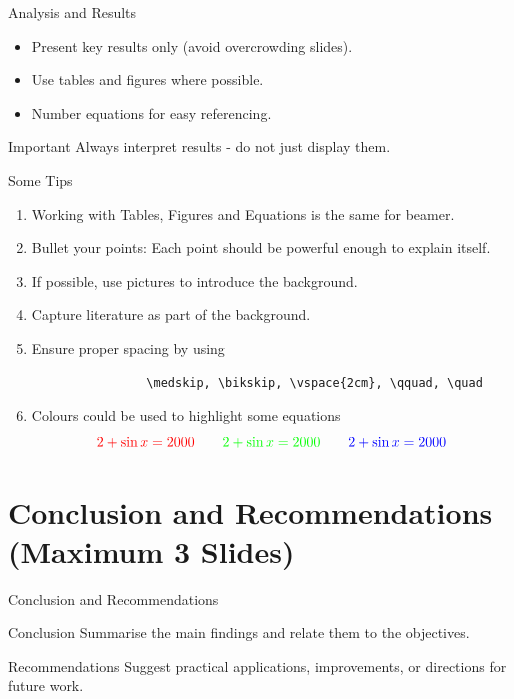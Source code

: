 \documentclass[aspectratio=169,12pt]{beamer}
\newcommand{\bcol}[2][blue]{\textcolor{#1}{#2}}
\begin{document}
	\begin{frame}{Analysis and Results}
		\begin{itemize}[<+->]
			\item Present key results only (avoid overcrowding slides).
			\item Use tables and figures where possible.
			\item Number equations for easy referencing.
		\end{itemize}
		
		\begin{alertblock}{Important}
			Always interpret results - do not just display them.
		\end{alertblock}
	\end{frame}
	
	
	\begin{frame}[fragile]{Some Tips} 
		\begin{enumerate} 
			\item Working with Tables, Figures and Equations is the same for beamer. 
			\item Bullet your points: Each point should be powerful enough to explain itself. 
			\item If possible, use pictures to introduce the background. 
			\item Capture literature as part of the background. 
			\item Ensure proper spacing by using 
			\begin{verbatim} 
				\medskip, \bikskip, \vspace{2cm}, \qquad, \quad 
			\end{verbatim} 
			\item Colours could be used to highlight some equations 
			\begin{equation}\label{key} \bcol[red]{2+ \sin x = 2000} \qquad \bcol[green]{2+ \sin x = 2000}\qquad \bcol{2+ \sin x = 2000} 
		\end{equation} 
	\end{enumerate} 
\end{frame}
	
	\section{Conclusion and Recommendations  (Maximum 3 Slides)}
	
	\begin{frame}{Conclusion and Recommendations}
		\begin{block}{Conclusion}
			Summarise the main findings and relate them to the objectives.
		\end{block}
		
		\begin{block}{Recommendations}
			Suggest practical applications, improvements, or directions for future work.
		\end{block}
	\end{frame}
	
\end{document}
